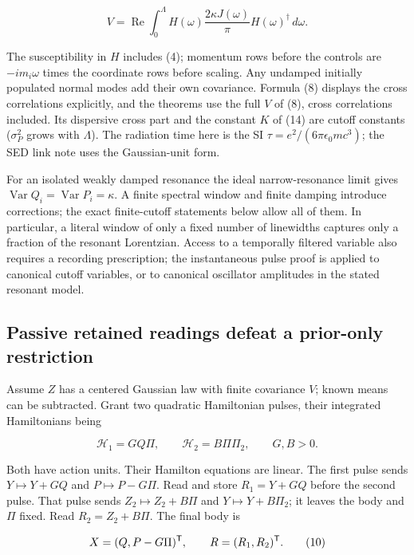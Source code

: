 \documentclass[11pt,a4paper]{article}
\begin{document}
\[V=\operatorname{Re}\int_0^\Lambda
 H(\omega)\frac{2\kappa J(\omega)}{\pi}
 H(\omega)^\dagger\,d\omega. \tag{8}\]

The susceptibility in \(H\) includes (4); momentum rows before the
controls are \(-i m_i\omega\) times the coordinate rows before scaling.
Any undamped initially populated normal modes add their own covariance.
Formula (8) displays the cross correlations explicitly, and the theorems
use the full \(V\) of (8), cross correlations included. Its dispersive
cross part and the constant \(K\) of (14) are cutoff constants
(\(\sigma_P^2\) grows with \(\Lambda\)). The radiation time here is the
SI \(\tau=e^2/(6\pi\epsilon_0mc^3)\); the SED link note uses the
Gaussian-unit form.

For an isolated weakly damped resonance the ideal narrow-resonance limit
gives \(\operatorname{Var}Q_i=\operatorname{Var}P_i=\kappa\). A finite
spectral window and finite damping introduce corrections; the exact
finite-cutoff statements below allow all of them. In particular, a
literal window of only a fixed number of linewidths captures only a
fraction of the resonant Lorentzian. Access to a temporally filtered
variable also requires a recording prescription; the instantaneous pulse
proof is applied to canonical cutoff variables, or to canonical
oscillator amplitudes in the stated resonant model.

\hypertarget{passive-retained-readings-defeat-a-prior-only-restriction}{%
\subsection{Passive retained readings defeat a prior-only
restriction}\label{passive-retained-readings-defeat-a-prior-only-restriction}}

Assume \(Z\) has a centered Gaussian law with finite covariance \(V\);
known means can be subtracted. Grant two quadratic Hamiltonian pulses,
their integrated Hamiltonians being

\[\mathcal H_1=GQ\Pi,\qquad
\mathcal H_2=B\Pi\Pi_2,\qquad G,B>0. \tag{9}\]

Both have action units. Their Hamilton equations are linear. The first
pulse sends \(Y\mapsto Y+GQ\) and \(P\mapsto P-G\Pi\). Read and store
\(R_1=Y+GQ\) before the second pulse. That pulse sends
\(Z_2\mapsto Z_2+B\Pi\) and \(Y\mapsto Y+B\Pi_2\); it leaves the body
and \(\Pi\) fixed. Read \(R_2=Z_2+B\Pi\). The final body is

\[X=(Q,P-G\Pi)^{\sf T},\qquad R=(R_1,R_2)^{\sf T}. \tag{10}\]
\end{document}
